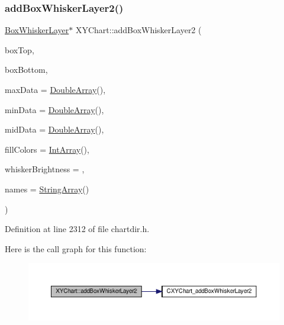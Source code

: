 \subsubsection{\texorpdfstring{add\+Box\+Whisker\+Layer2()}{addBoxWhiskerLayer2()}}
{\footnotesize\ttfamily \hyperlink{class_box_whisker_layer}{Box\+Whisker\+Layer}$\ast$ X\+Y\+Chart\+::add\+Box\+Whisker\+Layer2 (\begin{DoxyParamCaption}\item[{\hyperlink{class_double_array}{Double\+Array}}]{box\+Top,  }\item[{\hyperlink{class_double_array}{Double\+Array}}]{box\+Bottom,  }\item[{\hyperlink{class_double_array}{Double\+Array}}]{max\+Data = {\ttfamily \hyperlink{class_double_array}{Double\+Array}()},  }\item[{\hyperlink{class_double_array}{Double\+Array}}]{min\+Data = {\ttfamily \hyperlink{class_double_array}{Double\+Array}()},  }\item[{\hyperlink{class_double_array}{Double\+Array}}]{mid\+Data = {\ttfamily \hyperlink{class_double_array}{Double\+Array}()},  }\item[{\hyperlink{class_int_array}{Int\+Array}}]{fill\+Colors = {\ttfamily \hyperlink{class_int_array}{Int\+Array}()},  }\item[{double}]{whisker\+Brightness = {},  }\item[{\hyperlink{class_string_array}{String\+Array}}]{names = {\ttfamily \hyperlink{class_string_array}{String\+Array}()} }\end{DoxyParamCaption})\hspace{0.3cm}{\ttfamily [inline]}}



Definition at line 2312 of file chartdir.\+h.

Here is the call graph for this function\+:
\nopagebreak
\begin{figure}[H]
\begin{center}
\leavevmode
\includegraphics[width=350pt]{class_x_y_chart_a43f380553d11ccc29b1e06dbaa85f49b_cgraph}
\end{center}
\end{figure}
\mbox{\label{class_x_y_chart_ae6ebf6d55fae7f770f8d54ba52c5265c}} 
